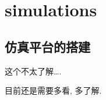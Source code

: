     \chapter{simulations}
    
    \section{仿真平台的搭建}
        
        这个不太了解\dots.
        
        目前还是需要多看, 多了解. 